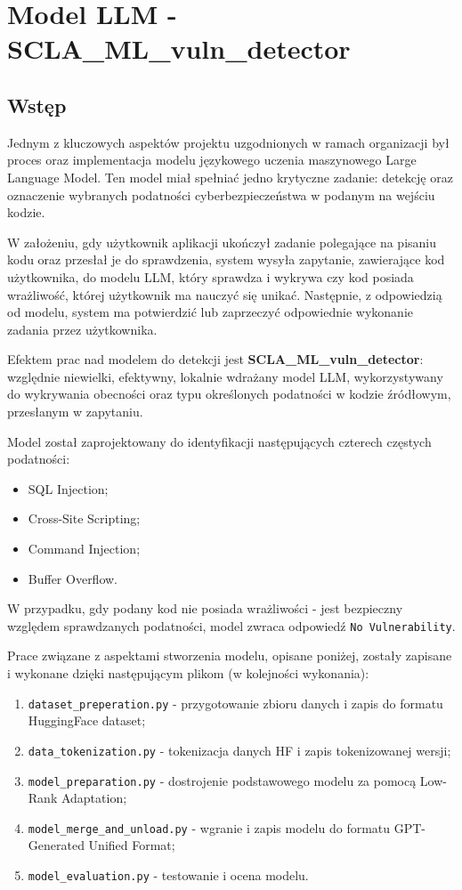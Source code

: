 \documentclass[12pt,a4paper]{article}
\begin{document}
\newpage

\section{Model LLM - SCLA\_ML\_vuln\_detector}

\subsection{Wstęp}

Jednym z kluczowych aspektów projektu uzgodnionych w ramach organizacji był proces oraz implementacja modelu językowego uczenia maszynowego Large Language Model.
Ten model miał spełniać jedno krytyczne zadanie: detekcję oraz oznaczenie wybranych podatności cyberbezpieczeństwa w podanym na wejściu kodzie.

W założeniu, gdy użytkownik aplikacji ukończył zadanie polegające na pisaniu kodu oraz przesłał je do sprawdzenia, system wysyła zapytanie, zawierające 
kod użytkownika, do modelu LLM, który sprawdza i wykrywa czy kod posiada wrażliwość, której użytkownik ma nauczyć się unikać. Następnie, z odpowiedzią od 
modelu, system ma potwierdzić lub zaprzeczyć odpowiednie wykonanie zadania przez użytkownika.

Efektem prac nad modelem do detekcji jest \textbf{SCLA\_ML\_vuln\_detector}: względnie niewielki, efektywny, lokalnie wdrażany model LLM, 
wykorzystywany do wykrywania obecności oraz typu określonych podatności w kodzie źródłowym, przesłanym w zapytaniu. 

Model został zaprojektowany do identyfikacji następujących czterech częstych podatności:

\begin{itemize}
    \item SQL Injection;
    \item Cross-Site Scripting;
    \item Command Injection;
    \item Buffer Overflow.
\end{itemize}

W przypadku, gdy podany kod nie posiada wrażliwości - jest bezpieczny względem sprawdzanych podatności, model zwraca odpowiedź \texttt{No Vulnerability}.

Prace związane z aspektami stworzenia modelu, opisane poniżej, zostały zapisane i wykonane dzięki następującym plikom (w kolejności wykonania):
\begin{enumerate}
    \item \texttt{dataset\_preperation.py} - przygotowanie zbioru danych i zapis do formatu HuggingFace dataset;
    \item \texttt{data\_tokenization.py} - tokenizacja danych HF i zapis tokenizowanej wersji; 
    \item \texttt{model\_preparation.py} - dostrojenie podstawowego modelu za pomocą Low-Rank Adaptation; 
    \item \texttt{model\_merge\_and\_unload.py} - wgranie i zapis modelu do formatu GPT-Generated Unified Format;
    \item \texttt{model\_evaluation.py} - testowanie i ocena modelu.
\end{enumerate} 
\end{document}
